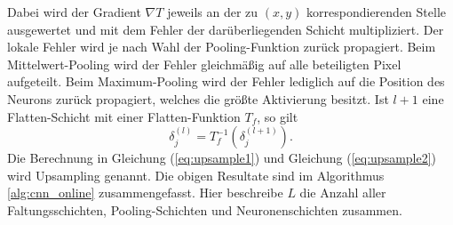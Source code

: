 Dabei wird der Gradient $\nabla T$ jeweils an der zu $(x,y)$ korrespondierenden Stelle ausgewertet und mit dem Fehler der darüberliegenden Schicht multipliziert.
Der lokale Fehler wird je nach Wahl der Pooling-Funktion zurück propagiert. Beim Mittelwert-Pooling wird der Fehler gleichmäßig auf alle beteiligten Pixel aufgeteilt. Beim Maximum-Pooling wird der Fehler lediglich auf die Position des Neurons zurück propagiert, welches die größte Aktivierung besitzt.
Ist $l+1$ eine Flatten-Schicht mit einer Flatten-Funktion $T_f$, so gilt
\begin{equation}
    \label{eq:upsample2}
    \delta_j^{(l)}=T^{-1}_f(\delta_j^{(l+1)}).
\end{equation}
Die Berechnung in Gleichung (\ref{eq:upsample1}) und Gleichung (\ref{eq:upsample2}) wird Upsampling genannt. Die obigen Resultate sind im Algorithmus \ref{alg:cnn_online} zusammengefasst. Hier beschreibe $L$ die Anzahl aller Faltungsschichten, Pooling-Schichten und Neuronenschichten zusammen.

